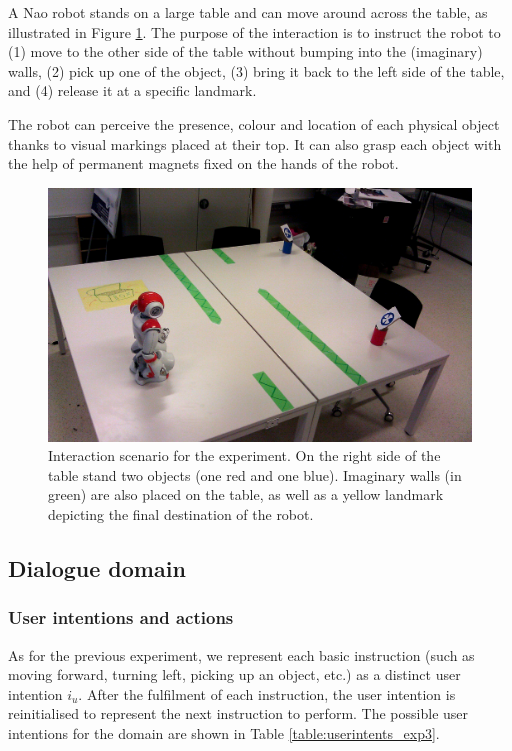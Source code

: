 A Nao robot stands on a large table and can move around across the table, as illustrated in Figure \ref{fig:scenario}.  The purpose of the interaction is to instruct the robot to (1) move to the other side of the table without bumping into the (imaginary) walls, (2) pick up one of the object, (3) bring it back to the left side of the table, and (4) release it at a specific landmark. 

The robot can perceive the presence, colour and location of each physical object thanks to visual markings placed at their top.  It can also grasp each object with the help of permanent magnets fixed on the hands of the robot. 

\begin{figure}[h]
\vspace{3mm}
\centering
\includegraphics[scale=0.13]{imgs/scenario.jpg} \vspace{3mm}
\caption{Interaction scenario for the experiment.  On the right side of the table stand two objects (one red and one blue).  Imaginary walls (in green) are also placed on the table, as well as a yellow landmark depicting the final destination of the robot. }
\label{fig:scenario}
\end{figure}


\subsection{Dialogue domain}

\subsubsection*{User intentions and actions}

As for the previous experiment, we represent each basic instruction (such as moving forward, turning left, picking up an object, etc.) as a distinct user intention $i_u$. After the fulfilment of each instruction, the user intention is reinitialised to represent the next instruction to perform.  The possible user intentions for the domain are shown in Table \ref{table:userintents_exp3}.  

